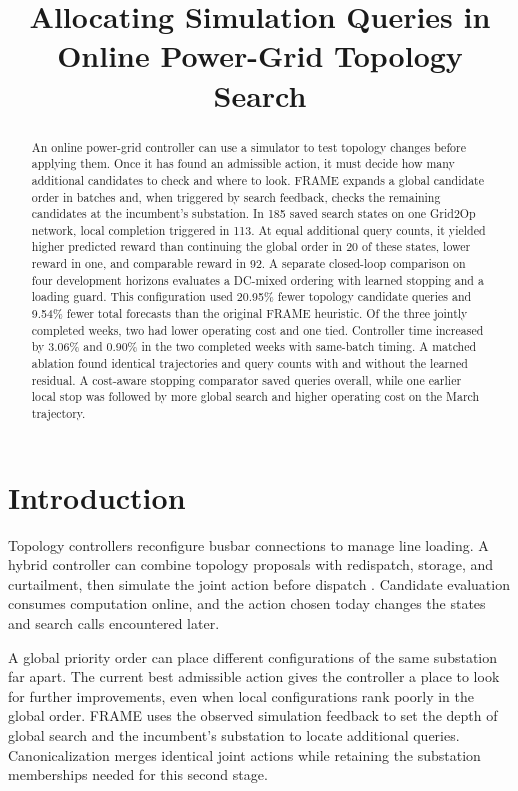 \documentclass[sigconf,review,anonymous]{acmart}
\title{Allocating Simulation Queries in Online Power-Grid Topology Search}
\begin{document}
\begin{abstract}
An online power-grid controller can use a simulator to test topology changes before applying them. Once it has found an admissible action, it must decide how many additional candidates to check and where to look. FRAME expands a global candidate order in batches and, when triggered by search feedback, checks the remaining candidates at the incumbent's substation. In 185 saved search states on one Grid2Op network, local completion triggered in 113. At equal additional query counts, it yielded higher predicted reward than continuing the global order in 20 of these states, lower reward in one, and comparable reward in 92. A separate closed-loop comparison on four development horizons evaluates a DC-mixed ordering with learned stopping and a loading guard. This configuration used 20.95\% fewer topology candidate queries and 9.54\% fewer total forecasts than the original FRAME heuristic. Of the three jointly completed weeks, two had lower operating cost and one tied. Controller time increased by 3.06\% and 0.90\% in the two completed weeks with same-batch timing. A matched ablation found identical trajectories and query counts with and without the learned residual. A cost-aware stopping comparator saved queries overall, while one earlier local stop was followed by more global search and higher operating cost on the March trajectory.
\end{abstract}
\maketitle

\section{Introduction}
Topology controllers reconfigure busbar connections to manage line loading. A hybrid controller can combine topology proposals with redispatch, storage, and curtailment, then simulate the joint action before dispatch \cite{marot2021,ljn}. Candidate evaluation consumes computation online, and the action chosen today changes the states and search calls encountered later.

A global priority order can place different configurations of the same substation far apart. The current best admissible action gives the controller a place to look for further improvements, even when local configurations rank poorly in the global order. FRAME uses the observed simulation feedback to set the depth of global search and the incumbent's substation to locate additional queries. Canonicalization merges identical joint actions while retaining the substation memberships needed for this second stage.
\end{document}
